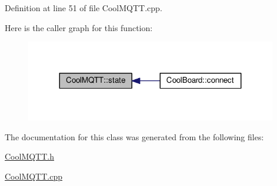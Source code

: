Definition at line 51 of file Cool\+M\+Q\+T\+T.\+cpp.

Here is the caller graph for this function\+:\nopagebreak
\begin{figure}[H]
\begin{center}
\leavevmode
\includegraphics[width=311pt]{class_cool_m_q_t_t_a5d003307eff78efbd585e42b43b72b6d_icgraph}
\end{center}
\end{figure}


The documentation for this class was generated from the following files\+:\begin{DoxyCompactItemize}
\item 
\hyperlink{_cool_m_q_t_t_8h}{Cool\+M\+Q\+T\+T.\+h}\item 
\hyperlink{_cool_m_q_t_t_8cpp}{Cool\+M\+Q\+T\+T.\+cpp}\end{DoxyCompactItemize}
